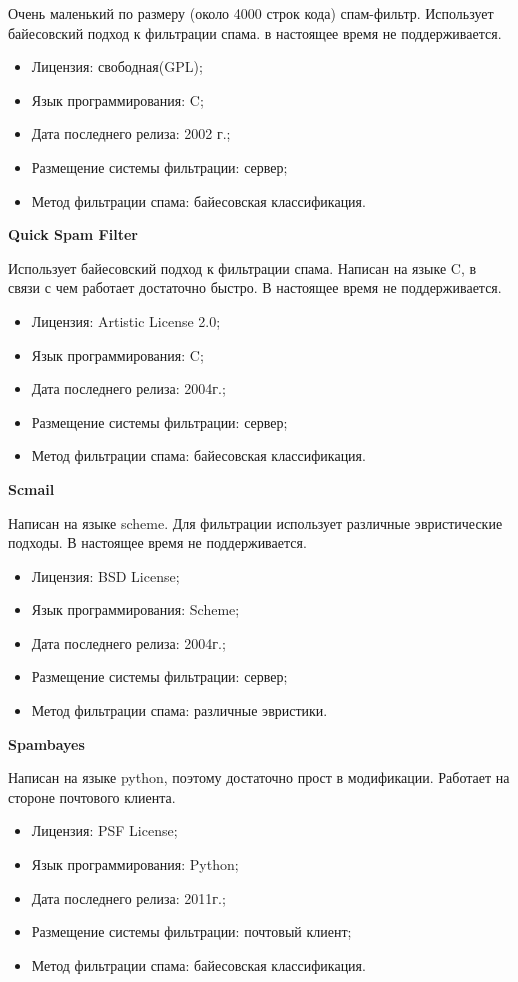 Очень маленький по размеру (около 4000 строк кода) спам-фильтр. Использует байесовский подход к фильтрации спама. в настоящее время не поддерживается.
\begin{itemize}
\item Лицензия: свободная(GPL); 
\item Язык программирования: C;
\item Дата последнего релиза: 2002 г.;
\item Размещение системы фильтрации: сервер;
\item Метод фильтрации спама: байесовская классификация.
\end{itemize}

\textbf{Quick Spam Filter}

Использует байесовский подход к фильтрации спама. Написан на языке C, в связи с чем работает достаточно быстро. В настоящее время не поддерживается.
\begin{itemize}
\item Лицензия: Artistic License 2.0;
\item Язык программирования: C;
\item Дата последнего релиза: 2004г.;
\item Размещение системы фильтрации: сервер;
\item Метод фильтрации спама: байесовская классификация.
\end{itemize}

\textbf{Scmail}

Написан на языке scheme. Для фильтрации использует различные эвристические подходы. В настоящее время не поддерживается.
\begin{itemize}
\item Лицензия: BSD License;
\item Язык программирования: Scheme;
\item Дата последнего релиза: 2004г.;
\item Размещение системы фильтрации: сервер;
\item Метод фильтрации спама: различные эвристики.
\end{itemize}

\textbf{Spambayes}

Написан на языке python, поэтому достаточно прост в модификации. Работает на стороне почтового клиента.

\begin{itemize}
\item Лицензия: PSF License;
\item Язык программирования: Python;
\item Дата последнего релиза: 2011г.;
\item Размещение системы фильтрации: почтовый клиент;
\item Метод фильтрации спама: байесовская классификация.
\end{itemize}



